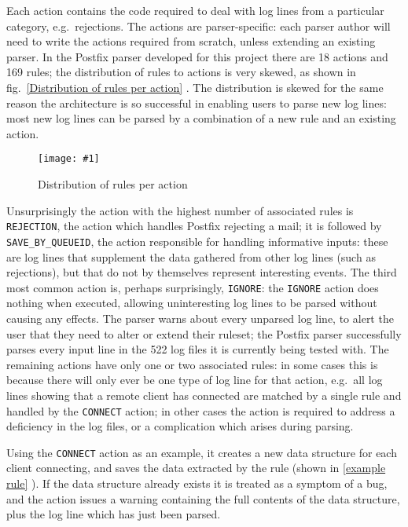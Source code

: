 \documentclass[draft]{svmult}
\newcommand{\showgraph}[3]{%
    \begin{figure}[hbt!]%
        \caption{#2}\label{#3}%
        \texttt{[image: \#1]}%
    \end{figure}%
}
\newcommand{\sectionref}[1]{%
    \textsection{}\vref*{#1}%
}
\newcommand{\refwithlabel}[2]{%
    #1~\vref{#2}%
}
\newcommand{\graphref}[1]{%
    \refwithlabel{fig.}{#1}%
}
\newcommand{\numberOFrules}[0]{%
    169%
}
\newcommand{\numberOFlogFILESall}[0]{%
    522%
}
\newcommand{\numberOFactions}[0]{%
    18%
}
\begin{document}
Each action contains the code required to deal with log lines from a
particular category, e.g.\ rejections.  The actions are parser-specific:
each parser author will need to write the actions required from scratch,
unless extending an existing parser.  In the Postfix parser developed for
this project there are \numberOFactions{} actions and \numberOFrules{}
rules; the distribution of rules to actions is very skewed, as shown in
\graphref{Distribution of rules per action}.  The distribution is skewed
for the same reason the architecture is so successful in enabling users to
parse new log lines: most new log lines can be parsed by a combination of a
new rule and an existing action.
\showgraph{build/graph-action-distribution}{Distribution of rules per
action}{Distribution of rules per action} Unsurprisingly the action with
the highest number of associated rules is \texttt{REJECTION}, the action
which handles Postfix rejecting a mail; it is followed by
\texttt{SAVE\_BY\_QUEUEID}, the action responsible for handling informative
inputs: these are log lines that supplement the data gathered from other
log lines (such as rejections), but that do not by themselves represent
interesting events.  The third most common action is, perhaps surprisingly,
\texttt{IGNORE}: the \texttt{IGNORE} action does nothing when executed,
allowing uninteresting log lines to be parsed without causing any effects.
The parser warns about every unparsed log line, to alert the user that they
need to alter or extend their ruleset; the Postfix parser successfully
parses every input line in the \numberOFlogFILESall{} log files it is
currently being tested with.  The remaining actions have only one or two
associated rules: in some cases this is because there will only ever be one
type of log line for that action, e.g.\ all log lines showing that a remote
client has connected are matched by a single rule and handled by the
\texttt{CONNECT} action; in other cases the action is required to address a
deficiency in the log files, or a complication which arises during parsing.

\label{example action}

Using the \texttt{CONNECT} action as an example, it creates a new data
structure for each client connecting, and saves the data extracted by the
rule (shown in \sectionref{example rule}).  If the data structure already
exists it is treated as a symptom of a bug, and the action issues a warning
containing the full contents of the data structure, plus the log line which
has just been parsed.
\end{document}
